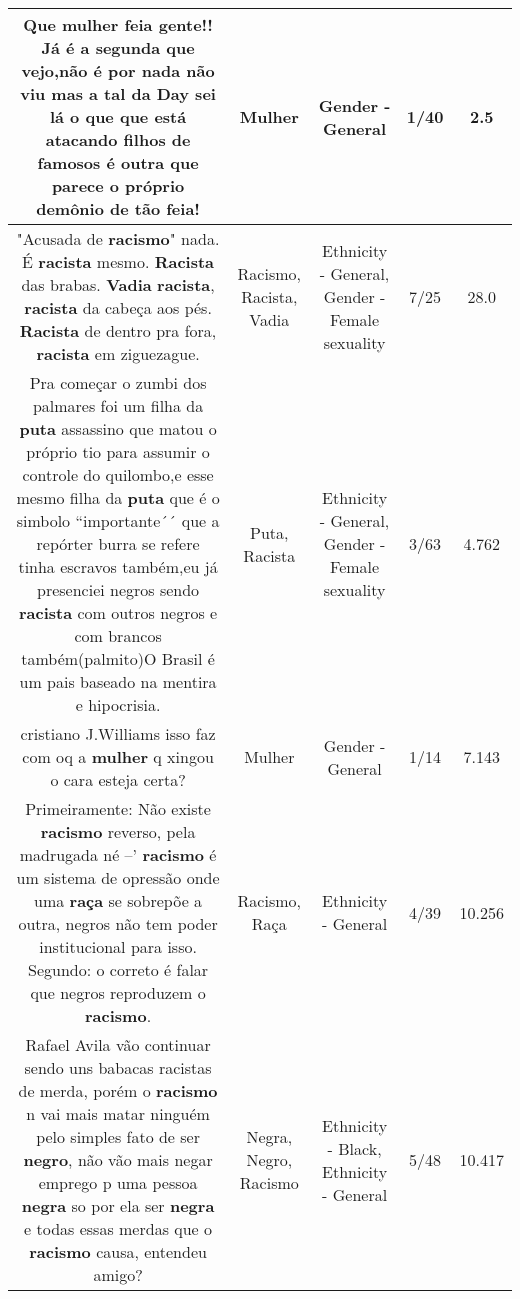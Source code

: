 \documentclass[11pt]{article}
\newlength\mylength
\begin{document}
\begin{center}
\begin{longtable}{|C{.65\mylength}|C{.30\mylength}|C{.12\mylength}|C{.12\mylength}|C{.12\mylength}|}
  \small Que \textbf{mulher} feia gente!! Já é a segunda que vejo,não é por nada não viu mas a tal  da Day sei lá o que que está atacando filhos de famosos é outra que parece o próprio demônio de tão feia!\normalsize   & Mulher & Gender - General & 1/40 & 2.5 \\  \hline
  \small "Acusada de \textbf{racismo}" nada. É \textbf{racista} mesmo. \textbf{Racista} das brabas. \textbf{Vadia} \textbf{racista}, \textbf{racista} da cabeça aos pés. \textbf{Racista} de dentro pra fora, \textbf{racista} em ziguezague.\normalsize   & Racismo, Racista, Vadia & Ethnicity - General, Gender - Female sexuality & 7/25 & 28.0 \\  \hline
  \small Pra começar o zumbi dos palmares foi um filha da \textbf{puta} assassino que matou o próprio tio para assumir o controle do quilombo,e esse mesmo filha da \textbf{puta} que é o simbolo ``importante´´ que a repórter burra se refere tinha escravos também,eu já presenciei negros sendo \textbf{racista} com outros negros e com brancos também(palmito)O Brasil é um pais baseado na mentira e hipocrisia.\normalsize   & Puta, Racista & Ethnicity - General, Gender - Female sexuality & 3/63 & 4.762 \\  \hline
  \small cristiano J.Williams isso faz com oq a \textbf{mulher} q xingou o cara esteja certa?\normalsize   & Mulher & Gender - General & 1/14 & 7.143 \\  \hline
  \small Primeiramente: Não existe \textbf{racismo} reverso, pela madrugada né  --' \textbf{racismo} é um sistema de opressão onde uma \textbf{raça} se sobrepõe a outra, negros não tem poder institucional para isso. Segundo: o correto é falar que negros reproduzem o \textbf{racismo}.\normalsize   & Racismo, Raça & Ethnicity - General & 4/39 & 10.256 \\  \hline
  \small Rafael Avila vão continuar sendo uns babacas racistas de merda, porém o \textbf{racismo} n vai mais matar ninguém pelo simples fato de ser \textbf{negro}, não vão mais negar emprego p uma pessoa \textbf{negra} so por ela ser \textbf{negra} e todas essas merdas que o \textbf{racismo} causa, entendeu amigo?\normalsize   & Negra, Negro, Racismo & Ethnicity - Black, Ethnicity - General & 5/48 & 10.417 \\  \hline

\end{longtable}
\end{center}
\end{document}

